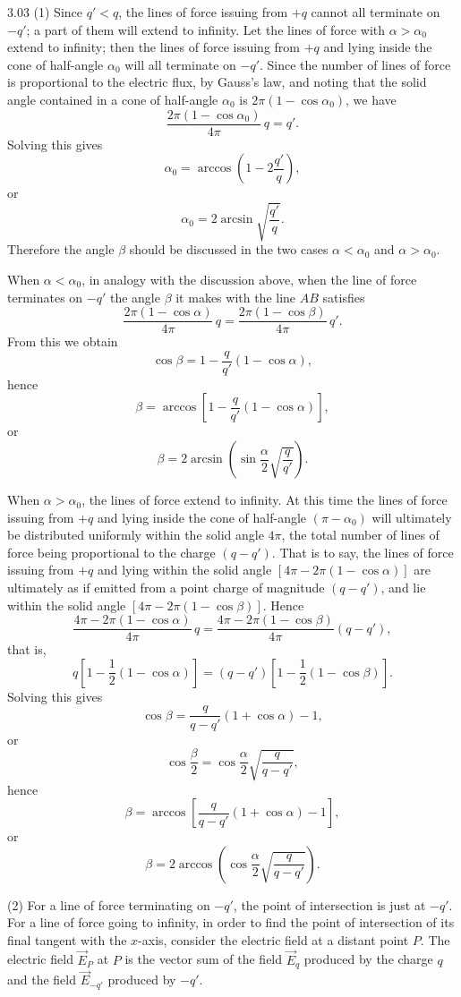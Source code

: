 \begin{solution}{3.03}
(1) Since $q'<q$, the lines of force issuing from $+q$ cannot all terminate on $-q'$; a part of them will extend to infinity. Let the lines of force with $\alpha>\alpha_0$ extend to infinity; then the lines of force issuing from $+q$ and lying inside the cone of half-angle $\alpha_0$ will all terminate on $-q'$. Since the number of lines of force is proportional to the electric flux, by Gauss's law, and noting that the solid angle contained in a cone of half-angle $\alpha_0$ is $2\pi(1-\cos\alpha_0)$, we have
\[
\frac{2\pi(1-\cos\alpha_0)}{4\pi}\,q=q'.
\]
Solving this gives
\[
\alpha_0=\arccos\left(1-2\frac{q'}{q}\right),
\]
or
\[
\alpha_0=2\arcsin\sqrt{\frac{q'}{q}}.
\]
Therefore the angle $\beta$ should be discussed in the two cases $\alpha<\alpha_0$ and $\alpha>\alpha_0$.

When $\alpha<\alpha_0$, in analogy with the discussion above, when the line of force terminates on $-q'$ the angle $\beta$ it makes with the line $AB$ satisfies
\[
\frac{2\pi(1-\cos\alpha)}{4\pi}\,q=\frac{2\pi(1-\cos\beta)}{4\pi}\,q'.
\]
From this we obtain
\[
\cos\beta=1-\frac{q}{q'}(1-\cos\alpha),
\]
hence
\[
\beta=\arccos\left[1-\frac{q}{q'}(1-\cos\alpha)\right],
\]
or
\[
\beta=2\arcsin\left(\sin\frac{\alpha}{2}\sqrt{\frac{q}{q'}}\right).
\]

When $\alpha>\alpha_0$, the lines of force extend to infinity. At this time the lines of force issuing from $+q$ and lying inside the cone of half-angle $(\pi-\alpha_0)$ will ultimately be distributed uniformly within the solid angle $4\pi$, the total number of lines of force being proportional to the charge $(q-q')$. That is to say, the lines of force issuing from $+q$ and lying within the solid angle $[4\pi-2\pi(1-\cos\alpha)]$ are ultimately as if emitted from a point charge of magnitude $(q-q')$, and lie within the solid angle $[4\pi-2\pi(1-\cos\beta)]$. Hence
\[
\frac{4\pi-2\pi(1-\cos\alpha)}{4\pi}\,q=\frac{4\pi-2\pi(1-\cos\beta)}{4\pi}(q-q'),
\]
that is,
\[
q\left[1-\frac{1}{2}(1-\cos\alpha)\right]=(q-q')\left[1-\frac{1}{2}(1-\cos\beta)\right].
\]
Solving this gives
\[
\cos\beta=\frac{q}{q-q'}(1+\cos\alpha)-1,
\]
or
\[
\cos\frac{\beta}{2}=\cos\frac{\alpha}{2}\sqrt{\frac{q}{q-q'}},
\]
hence
\[
\beta=\arccos\left[\frac{q}{q-q'}(1+\cos\alpha)-1\right],
\]
or
\[
\beta=2\arccos\left(\cos\frac{\alpha}{2}\sqrt{\frac{q}{q-q'}}\right).
\]

(2) For a line of force terminating on $-q'$, the point of intersection is just at $-q'$. For a line of force going to infinity, in order to find the point of intersection of its final tangent with the $x$-axis, consider the electric field at a distant point $P$. The electric field $\vec{E}_P$ at $P$ is the vector sum of the field $\vec{E}_q$ produced by the charge $q$ and the field $\vec{E}_{-q'}$ produced by $-q'$.


\end{solution}
